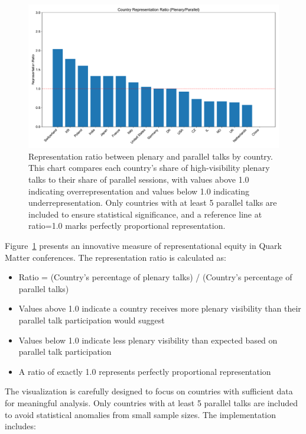 \documentclass[a4paper,11pt]{article}
\begin{document}
\begin{figure}[H]
\centering
\includegraphics[width=\textwidth]{figures/representation_ratio.pdf}
\caption{Representation ratio between plenary and parallel talks by country. This chart compares each country's share of high-visibility plenary talks to their share of parallel sessions, with values above 1.0 indicating overrepresentation and values below 1.0 indicating underrepresentation. Only countries with at least 5 parallel talks are included to ensure statistical significance, and a reference line at ratio=1.0 marks perfectly proportional representation.}
\label{fig:representation_ratio}
\end{figure}

Figure~\ref{fig:representation_ratio} presents an innovative measure of representational equity in Quark Matter conferences. The representation ratio is calculated as:

\begin{itemize}
    \item Ratio = (Country's percentage of plenary talks) / (Country's percentage of parallel talks)
    \item Values above 1.0 indicate a country receives more plenary visibility than their parallel talk participation would suggest
    \item Values below 1.0 indicate less plenary visibility than expected based on parallel talk participation
    \item A ratio of exactly 1.0 represents perfectly proportional representation
\end{itemize}

The visualization is carefully designed to focus on countries with sufficient data for meaningful analysis. Only countries with at least 5 parallel talks are included to avoid statistical anomalies from small sample sizes. The implementation includes:
\end{document}

